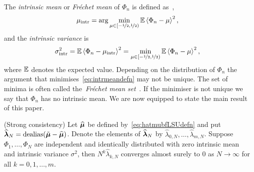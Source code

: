 \documentclass[journal]{IEEEtran}
\begin{document}
The \emph{intrinsic mean} or \emph{Fr\'{e}chet mean} of $\Phi_n$ is defined as~\cite{McKilliam_mean_dir_est_sq_arc_length2010,Bhattacharya_int_ext_means_2003,Bhattacharya_int_ext_means_2005},
\begin{equation}\label{eq:intrmeandefn}
 \mu_{\text{intr}}  = \arg \min_{\mu \in [-\nicefrac{1}{2}, \nicefrac{1}{2})} \expect \fracpart{\Phi_n - \mu}^2, 
\end{equation}
and the \emph{intrinsic variance} is
\[
\sigma_{\text{intr}}^2 = {\mathbb E}\left\langle \Phi_n - \mu_{\text{intr}} \right\rangle^2 = \min_{\mu \in [-\nicefrac{1}{2}, \nicefrac{1}{2})} {\mathbb E} \left\langle \Phi_n - \mu \right\rangle^2,
\]
where ${\mathbb E}$ denotes the expected value.  Depending on the distribution of $\Phi_n$ the argument that minimises~\eqref{eq:intrmeandefn} may not be unique.  The set of minima is often called the~\emph{Fr\'{e}chet mean set}~\cite{Bhattacharya_int_ext_means_2003,Bhattacharya_int_ext_means_2005}.  If the minimiser is not unique we say that $\Phi_n$ has no intrinsic mean.  %
We are now equipped to state the main result of this paper.


 
\begin{theorem} \label{thm:asymp_proof}  (Strong consistency) 
Let $\widehat{\boldsymbol{\mu}}$ be defined by~\eqref{eq:hatmubfLSUdefn} and put $\widehat{\boldsymbol{\lambda}}_N = \operatorname{dealias}(\tilde{\boldsymbol{\mu}} - \widehat{\boldsymbol{\mu}})$.  Denote the elements of $\widehat{\boldsymbol{\lambda}}_N$ by $\widehat{\lambda}_{0,N}, \dots, \widehat{\lambda}_{m,N}$.  Suppose $\Phi_1, \dots, \Phi_N$ are independent and identically distributed with zero intrinsic mean and intrinsic variance $\sigma^2$, then $N^k \widehat{\lambda}_{k,N}$ converges almost surely to $0$ as $N\rightarrow\infty$ for all $k = 0, 1, \dots, m$.
\end{theorem}
\end{document}
